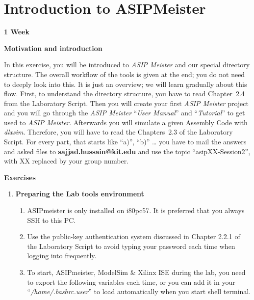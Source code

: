 \documentclass[
]{article}
\author{}
\date{}
\begin{document}
\hypertarget{introduction-to-asipmeister}{%
\section{Introduction to
ASIPMeister}\label{introduction-to-asipmeister}}

\textbf{{1 Week}}

\textbf{Motivation and introduction}

In this exercise, you will be introduced to \emph{ASIP Meister} and our
special directory structure. The overall workflow of the tools is given
at the end; you do not need to deeply look into this. It is just an
overview; we will learn gradually about this flow. First, to understand
the directory structure, you have to read Chapter~2.4 from the
Laboratory Script. Then you will create your first \emph{ASIP Meister}
project and you will go through the \emph{ASIP Meister} ``\emph{User
Manual}'' and ``\emph{Tutorial}'' to get used to \emph{ASIP Meister}.
Afterwards you will simulate a given Assembly Code with \emph{dlxsim}.
Therefore, you will have to read the Chapters~2.3 of the Laboratory
Script. For every part, that starts like ``a)'', ``b)'' \ldots{} you
have to mail the answers and asked files to
\textbf{sajjad.hussain@kit.edu} and use the topic ``asipXX-Session2'',
with XX replaced by your group number.

\textbf{Exercises}

\begin{enumerate}
\def\labelenumi{\arabic{enumi}.}
\item
  \textbf{Preparing the Lab tools environment}

  \begin{enumerate}
  \def\labelenumii{\arabic{enumii}.}
  \item
    ASIPmeister is only installed on i80pc57. It is preferred that you
    always SSH to this PC.
  \item
    Use the public-key authentication system discussed in Chapter 2.2.1
    of the Laboratory Script to avoid typing your password each time
    when logging into frequently.
  \item
    To start, ASIPmeister, ModelSim \& Xilinx ISE during the lab, you
    need to export the following variables each time, or you can add it
    in your ``\emph{/home/.bashrc.user}'' to load automatically when you
    start shell terminal.
  \end{enumerate}
\end{enumerate}
\end{document}
